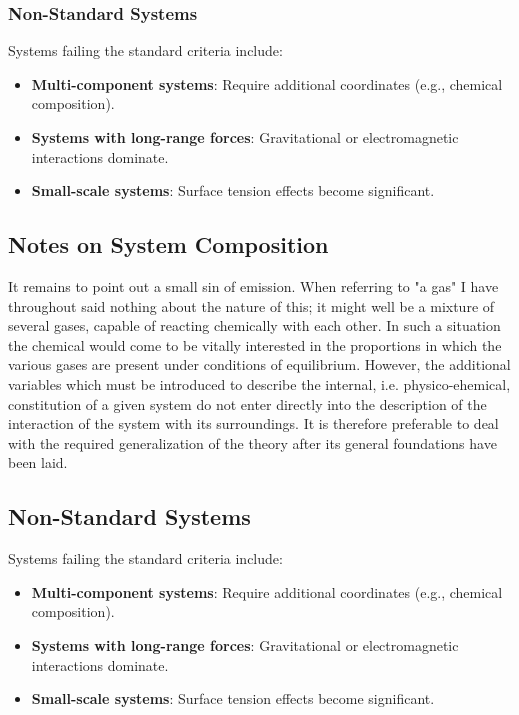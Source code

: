 \documentclass{article}
\theoremstyle{definition}
\begin{document}
\subsubsection{Non-Standard Systems}
Systems failing the standard criteria include:
\begin{itemize}
    \item \textbf{Multi-component systems}: Require additional coordinates (e.g., chemical composition).
    \item \textbf{Systems with long-range forces}: Gravitational or electromagnetic interactions dominate.
    \item \textbf{Small-scale systems}: Surface tension effects become significant.
\end{itemize}

\subsection{Notes on System Composition}
It remains to point out a small sin of emission. When referring to "a gas" I have throughout said nothing about the nature of this; it might well be a mixture of several gases, capable of reacting chemically with each other. In such a situation the chemical would come to be vitally interested in the proportions in which the various gases are present under conditions of equilibrium. However, the additional variables which must be introduced to describe the internal, i.e. physico-ehemical, constitution of a given system do not enter directly into the description of the interaction of the system with its surroundings. It is therefore preferable to deal with the required generalization of the theory after its general foundations have been laid.

\subsection*{Non-Standard Systems}
Systems failing the standard criteria include:
\begin{itemize}
    \item \textbf{Multi-component systems}: Require additional coordinates (e.g., chemical composition).
    \item \textbf{Systems with long-range forces}: Gravitational or electromagnetic interactions dominate.
    \item \textbf{Small-scale systems}: Surface tension effects become significant.
\end{itemize}
\end{document}
